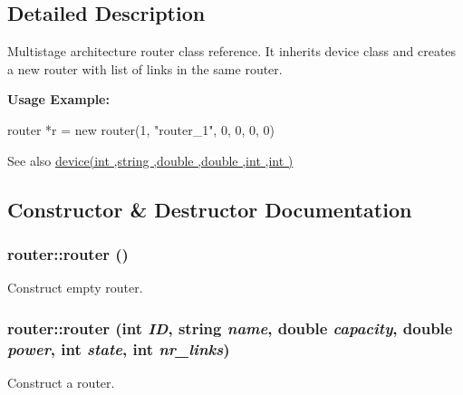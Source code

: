 \subsection{Detailed Description}
Multistage architecture router class reference. It inherits device class and creates a new router with list of links in the same router.

{\bfseries Usage Example:} 
\begin{DoxyCode}
 router *r = new router(1, "router_1", 0, 0, 0, 0)
\end{DoxyCode}
 \begin{DoxySeeAlso}{See also}
\hyperlink{classdevice_a57b9c4ac7a8bd970b81b1154ae79a5de}{device(int ,string ,double ,double ,int ,int )} 
\end{DoxySeeAlso}


\subsection{Constructor \& Destructor Documentation}
\hypertarget{classrouter_af5559739f6e4f9b1c7f7bf80e32f6cd9}{
\subsubsection[{router}]{\setlength{\rightskip}{0pt plus 5cm}router::router ()}}
\label{classrouter_af5559739f6e4f9b1c7f7bf80e32f6cd9}


Construct empty router. 

\hypertarget{classrouter_a43d7888550284a3bffff71abf6c087eb}{
\subsubsection[{router}]{\setlength{\rightskip}{0pt plus 5cm}router::router (int {\em ID}, \/  string {\em name}, \/  double {\em capacity}, \/  double {\em power}, \/  int {\em state}, \/  int {\em nr\_\-links})}}
\label{classrouter_a43d7888550284a3bffff71abf6c087eb}


Construct a router. 



